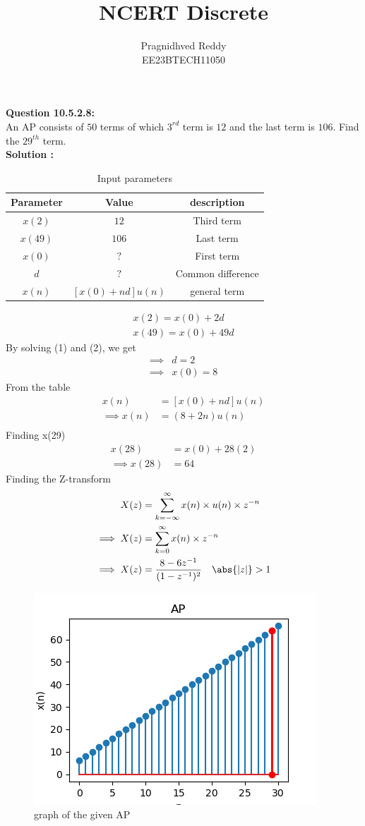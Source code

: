 \documentclass[journal,12pt,twocolumn]{IEEEtran}
\title{NCERT Discrete}
\author{Pragnidhved Reddy\\EE23BTECH11050}
\date{}
\begin{document}
\maketitle
\newpage
\bigskip
\textbf{Question 10.5.2.8:}\\
An AP consists of $50$ terms of which $3^{rd}$ term is $12$ and the last term is $106$. Find the $29^{th}$ term.\\
\textbf{Solution :}\\
\begin{table}[H]
\centering
\begin{tabular}{|c|c|c|}\hline
\textbf{Parameter} & \textbf{Value} & \textbf{description}\\ \hline
$x(2)$ & $12$ & Third term\\ \hline
$x(49)$ & $106$ & Last term\\ \hline
$x(0)$ & $?$ & First term \\ \hline
$d$ & $?$ & Common difference\\ \hline
$x(n)$ & $[x(0)+nd]u(n)$ & general term \\ \hline
\end{tabular}
\caption{Input parameters}
\end{table}
\begin{align}
x(2)=x(0)+2d\\
x(49)=x(0)+49d
\end{align}
By solving (1) and (2), we get
\begin{align}
\implies &d=2\\
\implies &x(0)=8
\end{align}
From the table
\begin{align}
x(n)&=[x(0)+nd]u(n)\\
\implies x(n)&=(8+2n)u(n)\\
\end{align}
Finding x(29)
\begin{align}
x(28)&=x(0)+28(2)\\
\implies x(28)&=64
\end{align}
Finding the Z-transform
\begin{align}
X(z)&=\sum_{k=-\infty}^{\infty}x(n)\times u(n)\times z^{-n}\\
\implies X(z)&=\sum_{k=0}^{\infty}x(n)\times z^{-n}\\
\implies X(z)&=\frac{8-6z^{-1}}{(1-z^{-1})^2} \quad \abs{|z|}>1
\end{align}
\begin{figure}[h!]
    \centering
    \includegraphics{figs/plot.png}
    \caption{graph of the given AP}
    \label{fig:1}
\end{figure}
\end{document}
